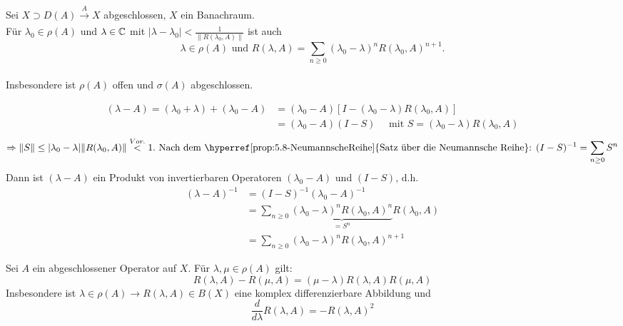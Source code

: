 \begin{satz}[Resolventendarstellung] \label{satz:13.4-Resolventendarstellung} 
	Sei $X \supset D(A) \xrightarrow[]{A} X$ abgeschlossen, $X$ ein Banachraum. \\
	Für $\lambda_{0} \in \rho(A)$ und $\lambda \in \mathbb{C}$ mit $|\lambda - \lambda_{0}| < \frac{1}{\| R(\lambda_{0}, A) \|}$ ist auch \\
		\[ \lambda \in \rho(A) \text{ und } R(\lambda, A) = \sum_{n \geq 0} (\lambda_{0} - \lambda)^{n} R(\lambda_{0}, A)^{n + 1}. \] \\
	Insbesondere ist $\rho(A)$ offen und $\sigma(A)$ abgeschlossen.
\end{satz}

\begin{beweis}
	\begin{align*}
		 (\lambda - A) = (\lambda_{0} + \lambda) + (\lambda_{0} - A) & = (\lambda_{0} - A)\left[I - (\lambda_{0} - \lambda) R(\lambda_{0}, A)\right] \\
		 & = (\lambda_{0} - A)(I - S) \quad \text{ mit } S = (\lambda_{0} - \lambda)R(\lambda_{0}, A)
	\end{align*}	
	\[ \Rightarrow \| S \| \leq | \lambda_{0} - \lambda| \| R(\lambda_{0}, A) \| \overset{Vor.}{<} 1. \text{ Nach dem \hyperref[prop:5.8-NeumannscheReihe]{Satz über die Neumannsche Reihe}: } (I - S)^{-1} = \sum_{n \geq 0} S^{n} \]
	Dann ist $(\lambda - A)$ ein Produkt von invertierbaren Operatoren $(\lambda_{0} - A)$ und $(I - S)$, d.h. 
	\begin{align*}
		(\lambda - A)^{-1} & = (I - S)^{-1}(\lambda_{0} - A)^{-1} \\
			& = \sum_{n \geq 0} \underbrace{(\lambda_{0} - \lambda)^{n}R(\lambda_{0}, A)^{n}}_{= S^{n}} R(\lambda_{0}, A) \\
			& = \sum_{n \geq 0} (\lambda_{0} - \lambda)^{n} R(\lambda_{0}, A)^{n + 1}
	\end{align*} 
\end{beweis}


\begin{satz}[Resolventengleichung] 
	Sei $A$ ein abgeschlossener Operator auf $X$. Für $\lambda, \mu \in \rho(A)$ gilt:
		\[ R(\lambda, A) - R(\mu, A) = (\mu - \lambda) R(\lambda, A) R(\mu, A) \]
	Insbesondere ist $\lambda \in \rho(A) \rightarrow R(\lambda, A) \in B(X)$ eine komplex differenzierbare Abbildung und 
		\[ \frac{d}{d \lambda} R(\lambda, A) = - R(\lambda, A)^{2} \]
\end{satz}

